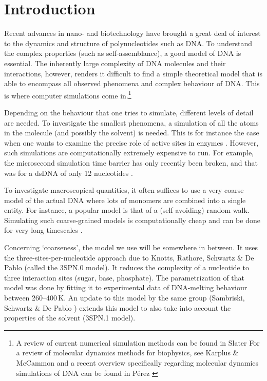 \section{Introduction}


Recent advances in nano- and biotechnology have brought a great deal of interest to the dynamics and structure of polynucleotides such as DNA. To understand the complex properties (such as self-assemblance), a good model of DNA is essential. The inherently large complexity of DNA molecules and their interactions, however, renders it difficult to find a simple theoretical model that is able to encompass all observed phenomena and complex behaviour of DNA. This is where computer simulations come in.\footnote{A review of current numerical simulation methods can be found in Slater \etal \cite{slater2009modeling} For a review of molecular dynamics methods for biophysics, see Karplus \& McCammon \cite{karplus2002molecular} and a recent overview specifically regarding molecular dynamics simulations of DNA can be found in P\'erez \etal\cite{perez2011frontiers}}

Depending on the behaviour that one tries to simulate, different levels of detail are needed. To investigate the smallest phenomena, a simulation of all the atoms in the molecule (and possibly the solvent) is needed. This is for instance the case when one wants to examine the precise role of active sites in enzymes \cite{weiner1986all}.  However, such simulations are computationally extremely expensive to run. For example, the microsecond simulation time barrier has only recently been broken, and that was for a dsDNA of only 12 nucleotides \cite{perez2007dynamics}.

To investigate macroscopical quantities, it often suffices to use a very coarse model of the actual DNA where lots of monomers are combined into a single entity. For instance, a popular model is that of a (self avoiding) random walk. Simulating such coarse-grained models is computationally cheap and can be done for very long timescales \cite{elber2005long}.

Concerning `coarseness', the model we use will be somewhere in between. It uses the three-sites-per-nucleotide approach due to Knotts, Rathore, Schwartz \& De Pablo \cite{knotts2007coarse} (called the 3SPN.0 model). It reduces the complexity of a nucleotide to three interaction sites (sugar, base, phosphate). The parametrization of that model was done by fitting it to experimental data of DNA-melting behaviour between 260--400\,K. An update to this model by the same group (Sambriski, Schwartz \& De Pablo \cite{sambriski2009mesoscale}) extends this model to also take into account the properties of the solvent (3SPN.1 model).


